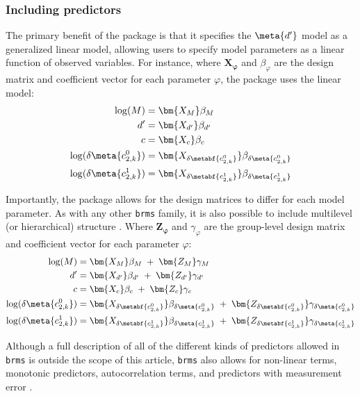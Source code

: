 \subsubsection{Including predictors}
The primary benefit of the \hmetad{} package is that it specifies the $\meta{d'}$ model as a generalized linear model, allowing users to specify model parameters as a linear function of observed variables. For instance, where $\bm{X_\varphi}$ and $\beta_\varphi$ are the design matrix and coefficient vector for each parameter $\varphi$, the \hmetad{} package uses the linear model:
\begin{align*}
    \log(M) &= \bm{X_M}\beta_M \\
    d' &= \bm{X_{d'}}\beta_{d'} \\
    c &= \bm{X_c}\beta_c \\
    \log(\delta\meta{c_{2,k}^0}) &= \bm{X_{\delta\metabf{c_{2,k}^0}}}\beta_{\delta\meta{c_{2,k}^0}} \\
    \log(\delta\meta{c_{2,k}^1}) &= \bm{X_{\delta\metabf{c_{2,k}^1}}}\beta_{\delta\meta{c_{2,k}^1}}
\end{align*}

Importantly, the \hmetad{} package allows for the design matrices to differ for each model parameter. As with any other \texttt{brms} family, it is also possible to include multilevel (or hierarchical) structure \parencite{buerkner2018}. Where $\bm{Z_\varphi}$ and $\gamma_\varphi$ are the group-level design matrix and coefficient vector for each parameter $\varphi$:
\begin{align*}
    \log(M) &= \bm{X_M}\beta_M \;+\; \bm{Z_M}\gamma_M \\
    d' &= \bm{X_{d'}}\beta_{d'} \;+\; \bm{Z_{d'}}\gamma_{d'} \\
    c &= \bm{X_c}\beta_c \;+\; \bm{Z_c}\gamma_c \\
    \log(\delta\meta{c_{2,k}^0}) &= \bm{X_{\delta\metabf{c_{2,k}^0}}}\beta_{\delta\meta{c_{2,k}^0}} \;+\; \bm{Z_{\delta\metabf{c_{2,k}^0}}}\gamma_{\delta\meta{c_{2,k}^0}} \\
    \log(\delta\meta{c_{2,k}^1}) &= \bm{X_{\delta\metabf{c_{2,k}^1}}}\beta_{\delta\meta{c_{2,k}^1}} \;+\; \bm{Z_{\delta\metabf{c_{2,k}^1}}}\gamma_{\delta\meta{c_{2,k}^1}}
\end{align*}

Although a full description of all of the different kinds of predictors allowed in \texttt{brms} is outside the scope of this article, \texttt{brms} also allows for non-linear terms, monotonic predictors, autocorrelation terms, and predictors with measurement error \parencite{buerkner2017, buerkner2018, burkner2020}.
